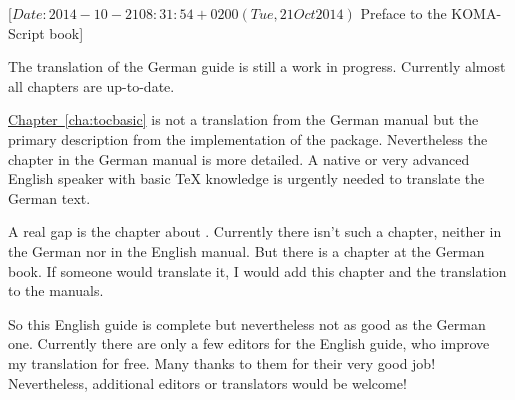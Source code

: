 %
%
%
%
%
%
%
%
%

                 [$Date: 2014-10-21 08:31:54 +0200 (Tue, 21 Oct 2014) $
                  Preface to the KOMA-Script book]



The translation of the German \KOMAScript{} guide is still a work in
progress. Currently almost all chapters are up-to-date.

\hyperref[cha:tocbasic]{Chapter~\ref*{cha:tocbasic}} is not a translation from
the German manual but the primary description from the implementation of the
package. Nevertheless the chapter in the German manual is more detailed. A
native or very advanced English speaker with basic TeX knowledge is urgently
needed to translate the German text.

A real gap is the chapter about . Currently there isn't such
a chapter, neither in the German nor in the English manual. But there is a
chapter at the German \KOMAScript{} book. If someone would translate it, I
would add this chapter and the translation to the manuals.

So this English guide is complete but nevertheless not as good as the German
one. Currently there are only a few editors for the English guide, who improve
my translation for free. Many thanks to them for their very good job!
Nevertheless, additional editors or translators would be welcome!

\endinput


